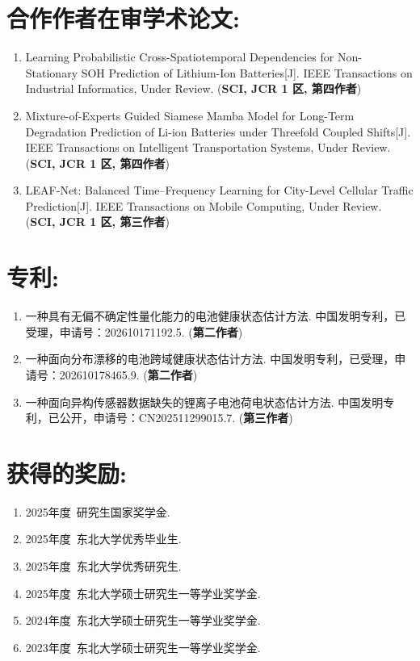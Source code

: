 {    \section*{合作作者在审学术论文:}
    \begin{enumerate}[leftmargin=*]
        \item Learning Probabilistic Cross-Spatiotemporal Dependencies for Non-Stationary SOH Prediction of Lithium-Ion Batteries[J]. IEEE Transactions on Industrial Informatics, Under Review. (\textbf{SCI, JCR 1 区, 第四作者})
        \item Mixture-of-Experts Guided Siamese Mamba Model for Long-Term Degradation Prediction of Li-ion Batteries under Threefold Coupled Shifts[J]. IEEE Transactions on Intelligent Transportation Systems, Under Review. (\textbf{SCI, JCR 1 区, 第四作者})
        \item LEAF-Net: Balanced Time–Frequency Learning for City-Level Cellular Traffic Prediction[J]. IEEE Transactions on Mobile Computing, Under Review. (\textbf{SCI, JCR 1 区, 第三作者})
    \end{enumerate}
    \section*{专利:}
    \begin{enumerate}[leftmargin=*]
        \item 一种具有无偏不确定性量化能力的电池健康状态估计方法. 中国发明专利，已受理，申请号：202610171192.5. (\textbf{第二作者})
        \item 一种面向分布漂移的电池跨域健康状态估计方法. 中国发明专利，已受理，申请号：202610178465.9. (\textbf{第二作者})
        \item 一种面向异构传感器数据缺失的锂离子电池荷电状态估计方法. 中国发明专利，已公开，申请号：CN202511299015.7. (\textbf{第三作者})
    \end{enumerate}
    \section*{获得的奖励:}
    \begin{enumerate}[leftmargin=*]
        \item 2025年度~研究生国家奖学金.
        \item 2025年度~东北大学优秀毕业生.
        \item 2025年度~东北大学优秀研究生.
        \item 2025年度~东北大学硕士研究生一等学业奖学金.
        \item 2024年度~东北大学硕士研究生一等学业奖学金.
        \item 2023年度~东北大学硕士研究生一等学业奖学金.
    \end{enumerate}
}{

}

